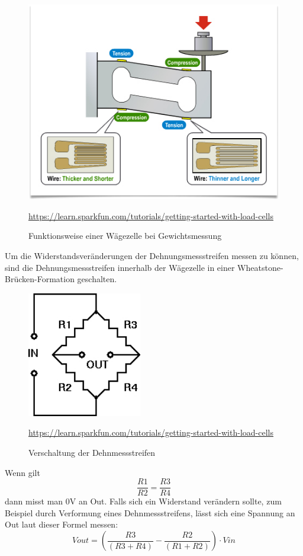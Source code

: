 \begin{figure}[ht]
    \center
    \includegraphics[width=15cm]{Bilder/waegezelle-funktionsweise.png}\\
    \caption{Funktionsweise einer Wägezelle bei Gewichtsmessung }
    \begin{flushleft} \quelle\url{https://learn.sparkfun.com/tutorials/getting-started-with-load-cells} \end{flushleft}
\end{figure}
\noindent
Um die Widerstandsveränderungen der Dehnungsmessstreifen messen zu können, sind die Dehnungsmessstreifen innerhalb der Wägezelle in einer Wheatstone-Brücken-Formation geschalten.

\newpage

\begin{figure}[ht]
    \center
    \includegraphics[width=5cm]{Bilder/waegezelle-verschaltung.jpg}\\
    \caption{Verschaltung der Dehnmessstreifen}
    \begin{flushleft} \quelle\url{https://learn.sparkfun.com/tutorials/getting-started-with-load-cells} \end{flushleft}
\end{figure}
Wenn gilt \[\frac{R1}{R2}=\frac{R3}{R4}\]dann misst man 0V an Out. Falls sich ein Widerstand verändern sollte, zum Beispiel durch Verformung eines Dehnmessstreifens, lässt sich eine Spannung an Out laut dieser Formel messen: \\
\[Vout=(\frac{R3}{(R3+R4)}-\frac{R2}{(R1+R2)}) \cdot Vin\]


